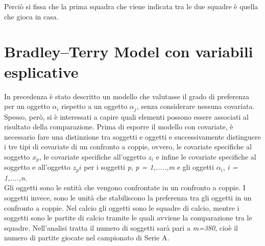 Perciò si fissa che la prima squadra che viene indicata tra le due squadre è quella che gioca in casa.
\section{Bradley–Terry Model con variabili esplicative}
In precedenza è stato descritto un modello che valutasse il grado di preferenza per un oggetto $\alpha_{i}$ rispetto a un oggetto $\alpha_{j}$, senza considerare nessuna covariata. Spesso, però, si è interessati a capire quali elementi possono essere associati al risultato della comparazione. Prima di esporre il modello con covariate, è necessario fare una distinzione tra soggetti e oggetti e successivamente distinguere i tre tipi di covariate di un confronto a coppie, ovvero, le covariate specifiche al soggetto $x_p$, le covariate specifiche all'oggetto $z_i$ e infine le covariate specifiche al soggetto e all'oggetto $z_pi$ per i soggetti \emph{p}, \emph{p = 1,.....,m} e gli oggetti $\alpha_{i}$, \emph{i = 1,....,n.}\\
Gli oggetti sono le entità che vengono confrontate in un confronto a coppie. I soggetti invece, sono le unità che stabiliscono la preferenza tra gli oggetti in un confronto a coppie. Nel calcio gli oggetti sono le squadre di calcio, mentre i soggetti sono le partite di calcio tramite le quali avviene la comparazione tra le squadre. Nell'analisi tratta il numero di soggetti sarà pari a \emph{m=380}, cioè il numero di partite giocate nel campionato di Serie A.
\\

